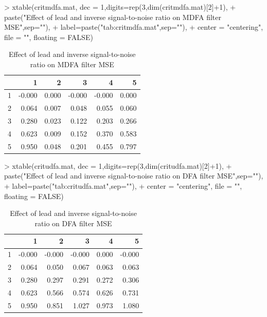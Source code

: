 \documentclass[a4paper]{book}
\begin{document}
\begin{Schunk}
\begin{Sinput}
>   xtable(critmdfa.mat, dec = 1,digits=rep(3,dim(critmdfa.mat)[2]+1),
+   paste("Effect of lead and  inverse signal-to-noise ratio on MDFA filter MSE",sep=""),
+   label=paste("tab:critmdfa.mat",sep=""),
+   center = "centering", file = "", floating = FALSE)
\end{Sinput}
\begin{Soutput}
\begin{table}[ht]
\centering
\begin{tabular}{rrrrrr}
  \hline
 & 1 & 2 & 3 & 4 & 5 \\ 
  \hline
1 & -0.000 & 0.000 & -0.000 & -0.000 & 0.000 \\ 
  2 & 0.064 & 0.007 & 0.048 & 0.055 & 0.060 \\ 
  3 & 0.280 & 0.023 & 0.122 & 0.203 & 0.266 \\ 
  4 & 0.623 & 0.009 & 0.152 & 0.370 & 0.583 \\ 
  5 & 0.950 & 0.048 & 0.201 & 0.455 & 0.797 \\ 
   \hline
\end{tabular}
\caption{Effect of lead and  inverse signal-to-noise ratio on MDFA filter MSE} 
\label{tab:critmdfa.mat}
\end{table}
\end{Soutput}
\end{Schunk}
 
\begin{Schunk}
\begin{Sinput}
>   xtable(critudfa.mat, dec = 1,digits=rep(3,dim(critudfa.mat)[2]+1),
+   paste("Effect of lead and  inverse signal-to-noise ratio on DFA filter MSE",sep=""),
+   label=paste("tab:critudfa.mat",sep=""),
+   center = "centering", file = "", floating = FALSE)
\end{Sinput}
\begin{Soutput}
\begin{table}[ht]
\centering
\begin{tabular}{rrrrrr}
  \hline
 & 1 & 2 & 3 & 4 & 5 \\ 
  \hline
1 & -0.000 & -0.000 & -0.000 & 0.000 & -0.000 \\ 
  2 & 0.064 & 0.050 & 0.067 & 0.063 & 0.063 \\ 
  3 & 0.280 & 0.297 & 0.291 & 0.272 & 0.306 \\ 
  4 & 0.623 & 0.566 & 0.574 & 0.626 & 0.731 \\ 
  5 & 0.950 & 0.851 & 1.027 & 0.973 & 1.080 \\ 
   \hline
\end{tabular}
\caption{Effect of lead and  inverse signal-to-noise ratio on DFA filter MSE} 
\label{tab:critudfa.mat}
\end{table}
\end{Soutput}
\end{Schunk}
\end{document}
